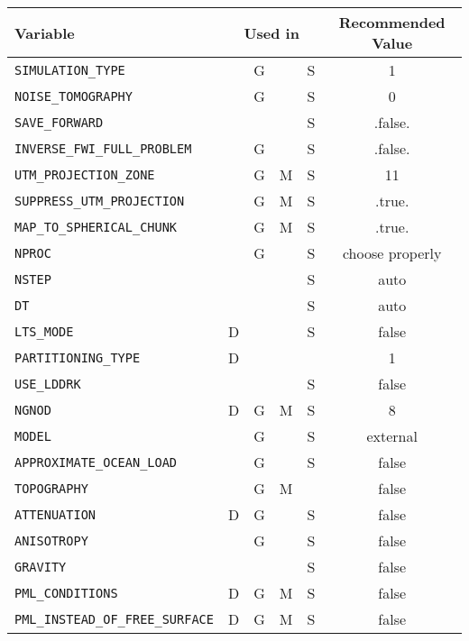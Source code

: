 \begin{longtable}{|p{7.7cm}|c|c|c|c|c|}\hline
		Variable & \multicolumn{4}{c}{Used in} & Recommended Value \\ \hline
		\verb+SIMULATION_TYPE+               &   & G &   & S & 1 \\ \hline
		\verb+NOISE_TOMOGRAPHY+              &   & G &   & S & 0 \\ \hline
		\verb+SAVE_FORWARD+                  &   &   &   & S & .false. \\ \hline
		\verb+INVERSE_FWI_FULL_PROBLEM+      &   & G &   & S & .false. \\ \hline
		\verb+UTM_PROJECTION_ZONE+           &   & G & M & S & 11 \\ \hline
		\verb+SUPPRESS_UTM_PROJECTION+       &   & G & M & S & .true. \\ \hline
		\verb+MAP_TO_SPHERICAL_CHUNK+        &   & G & M & S & .true. \\ \hline
		\verb+NPROC+                         &   & G &   & S & choose properly \\ \hline
		\verb+NSTEP+                         &   &   &   & S & auto \\ \hline
		\verb+DT+                            &   &   &   & S & auto \\ \hline
		\verb+LTS_MODE+                      & D &   &   & S & false \\ \hline
      \verb+PARTITIONING_TYPE+             & D &   &   &   & 1 \\ \hline
		\verb+USE_LDDRK+                     &   &   &   & S & false \\ \hline
		\verb+NGNOD+                         & D & G & M & S & 8 \\ \hline
		\verb+MODEL+                         &   & G &   & S & external \\ \hline
		\verb+APPROXIMATE_OCEAN_LOAD+        &   & G &   & S & false \\ \hline
		\verb+TOPOGRAPHY+                    &   & G & M &   & false \\ \hline
		\verb+ATTENUATION+                   & D & G &   & S & false \\ \hline
		\verb+ANISOTROPY+                    &   & G &   & S & false \\ \hline
		\verb+GRAVITY+                       &   &   &   & S & false \\ \hline
		\verb+PML_CONDITIONS+                & D & G & M & S & false \\ \hline
		\verb+PML_INSTEAD_OF_FREE_SURFACE+   & D & G & M & S & false \\ \hline

\end{longtable}
